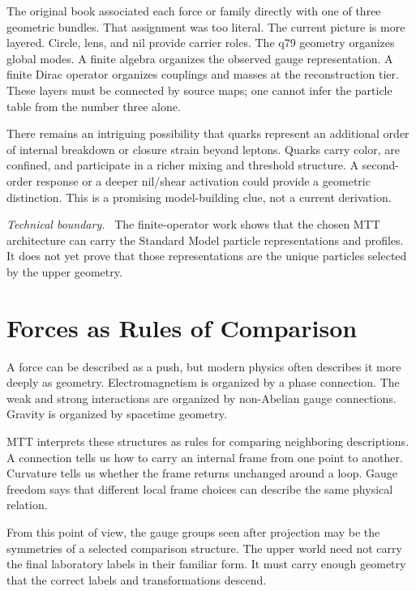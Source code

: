 \documentclass[11pt,openany]{book}
\newenvironment{technicalboundary}
  {\par\small\noindent\textit{Technical boundary.}\ }
  {\par}
\begin{document}
The original book associated each force or family directly with one of three
geometric bundles. That assignment was too literal. The current picture is
more layered. Circle, lens, and nil provide carrier roles. The q79 geometry
organizes global modes. A finite algebra organizes the observed gauge
representation. A finite Dirac operator organizes couplings and masses at the
reconstruction tier. These layers must be connected by source maps; one
cannot infer the particle table from the number three alone.

There remains an intriguing possibility that quarks represent an additional
order of internal breakdown or closure strain beyond leptons. Quarks carry
color, are confined, and participate in a richer mixing and threshold
structure. A second-order response or a deeper nil/shear activation could
provide a geometric distinction. This is a promising model-building clue,
not a current derivation.

\begin{technicalboundary}
The finite-operator work shows that the chosen MTT architecture can carry the
Standard Model particle representations and profiles. It does not yet prove
that those representations are the unique particles selected by the upper
geometry.
\end{technicalboundary}

\chapter{Forces as Rules of Comparison}

A force can be described as a push, but modern physics often describes it
more deeply as geometry. Electromagnetism is organized by a phase connection.
The weak and strong interactions are organized by non-Abelian gauge
connections. Gravity is organized by spacetime geometry.

MTT interprets these structures as rules for comparing neighboring
descriptions. A connection tells us how to carry an internal frame from one
point to another. Curvature tells us whether the frame returns unchanged
around a loop. Gauge freedom says that different local frame choices can
describe the same physical relation.

From this point of view, the gauge groups seen after projection may be the
symmetries of a selected comparison structure. The upper world need not carry
the final laboratory labels in their familiar form. It must carry enough
geometry that the correct labels and transformations descend.
\end{document}
